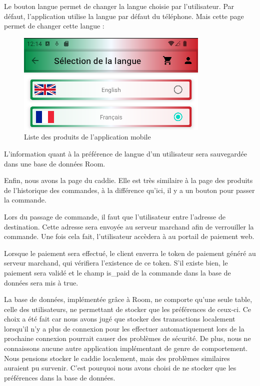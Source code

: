 Le bouton langue permet de changer la langue choisie par l'utilisateur. Par défaut, l'application utilise la
langue par défaut du téléphone. Mais cette page permet de changer cette langue :

\begin{figure}[H]
    \centering
    \includegraphics[width=\textwidth]{./img/joey-img-8.png}
    \caption{Liste des produits de l'application mobile}
    \label{fig:poc-lang}
\end{figure}

L'information quant à la préférence de langue d'un utilisateur sera sauvegardée dans une base de
données Room.

Enfin, nous avons la page du caddie. Elle est très similaire à la page des produits de l'historique des
commandes, à la différence qu'ici, il y a un bouton pour passer la commande.

Lors du passage de commande, il faut que l'utilisateur entre l'adresse de destination. Cette adresse sera
envoyée au serveur marchand afin de verrouiller la commande. Une fois cela fait, l'utilisateur accèdera à
au portail de paiement web.

Lorsque le paiement sera effectué, le client enverra le token de paiement généré au serveur marchand,
qui vérifiera l'existence de ce token. S'il existe bien, le paiement sera validé et le champ is\_paid de la
commande dans la base de données sera mis à true.

La base de données, implémentée grâce à Room, ne comporte qu'une seule table, celle des utilisateurs,
ne permettant de stocker que les préférences de ceux-ci. Ce choix a été fait car nous avons jugé que
stocker des transactions localement lorsqu'il n'y a plus de connexion pour les effectuer automatiquement
lors de la prochaine connexion pourrait causer des problèmes de sécurité. De plus, nous ne connaissons
aucune autre application implémentant de genre de comportement. Nous pensions stocker le caddie
localement, mais des problèmes similaires auraient pu survenir. C'est pourquoi nous avons choisi de ne
stocker que les préférences dans la base de données.

